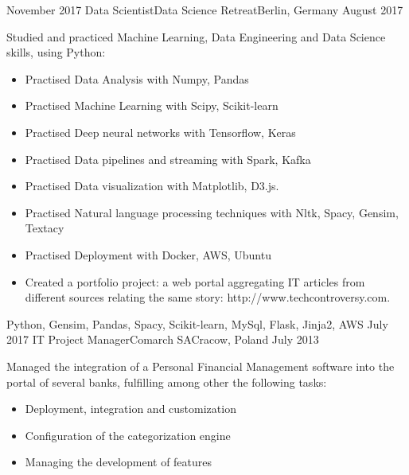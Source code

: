 %
%
%
\begin{experiences}
  \experience
    {November 2017}   {Data Scientist}{Data Science Retreat}{Berlin, Germany}
    {August 2017}  {Studied and practiced Machine Learning, Data Engineering and Data Science skills, using Python: 
    				
                      \begin{itemize}
                      \item Practised Data Analysis with Numpy, Pandas
                      \item Practised Machine Learning with Scipy, Scikit-learn
					   \item Practised Deep neural networks with Tensorflow, Keras
					   \item Practised Data pipelines and streaming with Spark, Kafka
					   \item Practised Data visualization with Matplotlib, D3.js. 
					   \item Practised Natural language processing techniques with Nltk, Spacy, Gensim, Textacy
					   \item Practised Deployment with Docker, AWS, Ubuntu
					   \item Created a portfolio project: a web portal aggregating IT articles from different sources relating the same story: http://www.techcontroversy.com.
                      \end{itemize}
                    }
                    {Python, Gensim, Pandas, Spacy, Scikit-learn, MySql, Flask, Jinja2, AWS}
  \emptySeparator
  \experience
    {July 2017} {IT Project Manager}{Comarch SA}{Cracow, Poland}
    {July 2013} {Managed the integration of a Personal Financial Management software into the portal of several banks, fulfilling among other the following tasks:
       			 \begin{itemize}
                        \item Deployment, integration and customization                            
                        \item Configuration of the categorization engine                        
                        \item Managing the development of features 

\end{itemize}}
\end{experiences}

